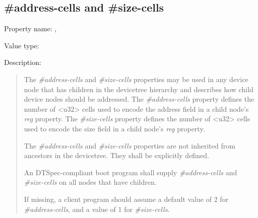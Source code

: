 \documentclass[a4paper,10pt,oneside]{sphinxmanual}
\begin{document}
\subsection{\#address-cells and \#size-cells}
\label{devicetree-basics:address-cells-and-size-cells}
Property name: , 

Value type: 

Description:
\begin{quote}

The \emph{\#address-cells} and \emph{\#size-cells} properties may be used in any
device node that has children in the devicetree hierarchy and describes
how child device nodes should be addressed. The \emph{\#address-cells}
property defines the number of \textless{}u32\textgreater{} cells used to encode the address
field in a child node’s \emph{reg} property. The \emph{\#size-cells} property
defines the number of \textless{}u32\textgreater{} cells used to encode the size field in a
child node’s \emph{reg} property.

The \emph{\#address-cells} and \emph{\#size-cells} properties are not inherited from
ancestors in the devicetree. They shall be explicitly defined.

An DTSpec-compliant boot program shall supply \emph{\#address-cells} and
\emph{\#size-cells} on all nodes that have children.

If missing, a client program should assume a default value of 2 for
\emph{\#address-cells}, and a value of 1 for \emph{\#size-cells}.
\end{quote}
\end{document}
